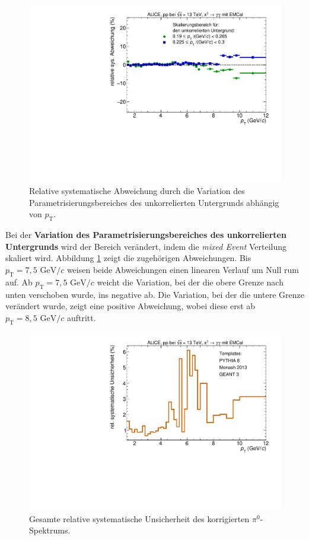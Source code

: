 \begin{figure}[t!]
\centering
\includegraphics[width=.65\linewidth]{YieldsSysUncerUncorrBkgVariation_Data_2016.pdf}
\caption{Relative systematische Abweichung durch die Variation des Parametrisierungsbereiches des unkorrelierten Untergrunds abhängig von $p_\text{T}$.}
\label{fig:LeftBkgSys}
\end{figure}
\newline
Bei der \textbf{Variation des Parametrisierungsbereiches des unkorrelierten Untergrunds} wird der Bereich verändert, indem die \textit{mixed Event} Verteilung skaliert wird.
Abbildung \ref{fig:LeftBkgSys} zeigt die zugehörigen Abweichungen.
Bis $p_\text{T} = 7,5 \text{ GeV}/c$ weisen beide Abweichungen einen linearen Verlauf um Null rum auf.
Ab $p_\text{T} = 7,5 \text{ GeV}/c$ weicht die Variation, bei der die obere Grenze nach unten verschoben wurde, ins negative ab.
Die Variation, bei der die untere Grenze verändert wurde, zeigt eine positive Abweichung, wobei diese erst ab $p_\text{T} = 8,5 \text{ GeV}/c$ auftritt.
\begin{figure}[t!]
\centering
\includegraphics[width=.65\linewidth]{SystematischeUnsicherheit_Data_2016.pdf}
\caption{Gesamte relative systematische Unsicherheit des korrigierten $\pi^ {0}$-Spektrums.}
\label{fig:SysUncer}
\end{figure}
\newline
